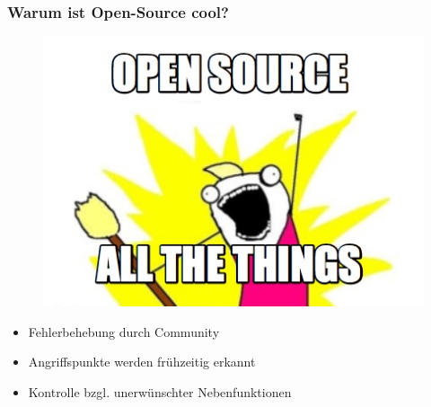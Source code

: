 \begin{frame}
\frametitle{Warum ist Open-Source cool?}
\begin{figure}
\includegraphics[scale=0.4]{resources/att.jpg}
\end{figure}
\begin{itemize}
	\item Fehlerbehebung durch Community
	\item Angriffspunkte werden frühzeitig erkannt
	\item Kontrolle bzgl. unerwünschter Nebenfunktionen
\end{itemize}
\end{frame}


